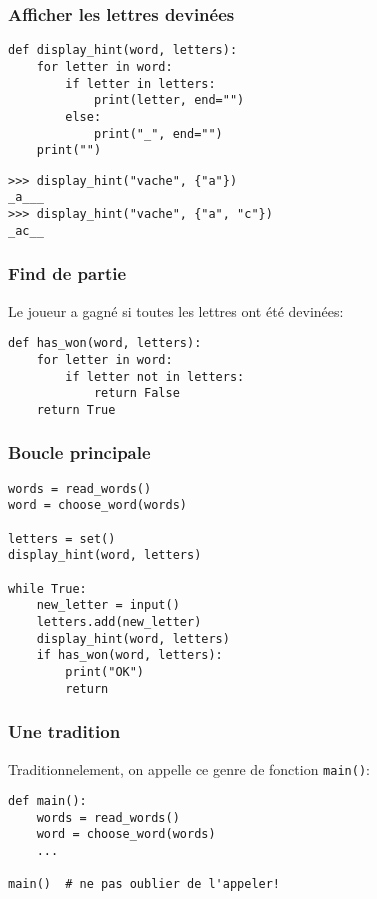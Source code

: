 \documentclass{beamer}
\begin{document}
\begin{frame}[fragile]
  \frametitle{Afficher les lettres devinées}

\begin{lstlisting}
def display_hint(word, letters):
    for letter in word:
        if letter in letters:
            print(letter, end="")
        else:
            print("_", end="")
    print("")
\end{lstlisting}

\begin{lstlisting}
>>> display_hint("vache", {"a"})
_a___
>>> display_hint("vache", {"a", "c"})
_ac__
\end{lstlisting}
\end{frame}

\begin{frame}[fragile]
  \frametitle{Find de partie}

Le joueur a gagné si toutes les lettres ont
été devinées:

\vfill

\begin{lstlisting}
def has_won(word, letters):
    for letter in word:
        if letter not in letters:
            return False
    return True
\end{lstlisting}
\end{frame}


\begin{frame}[fragile]
  \frametitle{Boucle principale}
\begin{lstlisting}
words = read_words()
word = choose_word(words)

letters = set()
display_hint(word, letters)

while True:
    new_letter = input()
    letters.add(new_letter)
    display_hint(word, letters)
    if has_won(word, letters):
        print("OK")
        return
\end{lstlisting}
\end{frame}

\begin{frame}[fragile]
  \frametitle{Une tradition}
Traditionnelement, on appelle ce genre de fonction \texttt{main()}:

\begin{lstlisting}
def main():
    words = read_words()
    word = choose_word(words)
    ...

main()  # ne pas oublier de l'appeler!
\end{lstlisting}
\end{frame}
\end{document}
